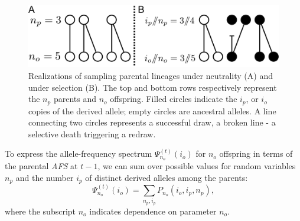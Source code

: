 \documentclass[9pt,twocolumn,twoside,lineno]{gsajnl}
\newcommand{\afsPsi}[2]{\Psi_{#1}^{(#2)}}
\begin{document}

\begin{figure}
  \centering
  \includegraphics[width=1.0\columnwidth]{fig/schematic-AB.pdf}

  \caption{\label{fig_schematic}
    Realizations of sampling parental lineages under neutrality (A) and under selection (B). The top
    and bottom rows respectively represent the $n_p$ parents and $n_o$ offspring. Filled circles
    indicate the $i_p$, or $i_o$ copies of the derived allele; empty circles are ancestral alleles.
    A line connecting two circles represents a successful draw, a broken line - a selective death
    triggering a redraw.  }

\end{figure}


To express the allele-frequency spectrum $\afsPsi{n_o}{t}(i_o)$ for $n_o$ offspring in terms of the parental
\textit{AFS} at $t-1$, we can sum over possible values for random variables $n_p$ and the number $i_p$ of distinct derived alleles
among the parents:
\begin{equation}
  \afsPsi{n_o}{t}(i_o)=\sum_{n_p,i_p} P_{n_o}(i_o,i_p,n_p),
\end{equation}
where the subscript $n_o$ indicates dependence on parameter $n_o$. 
\end{document}
